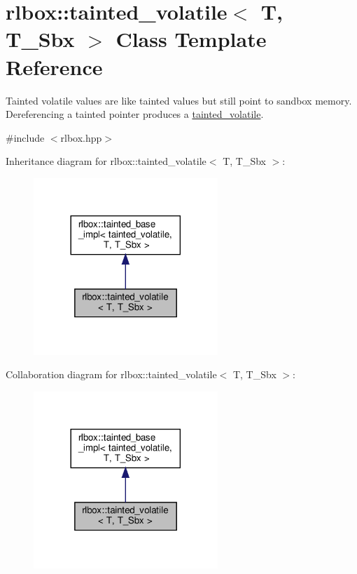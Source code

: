 \hypertarget{classrlbox_1_1tainted__volatile}{}\section{rlbox\+:\+:tainted\+\_\+volatile$<$ T, T\+\_\+\+Sbx $>$ Class Template Reference}
\label{classrlbox_1_1tainted__volatile}


Tainted volatile values are like tainted values but still point to sandbox memory. Dereferencing a tainted pointer produces a \hyperlink{classrlbox_1_1tainted__volatile}{tainted\+\_\+volatile}.  




{\ttfamily \#include $<$rlbox.\+hpp$>$}



Inheritance diagram for rlbox\+:\+:tainted\+\_\+volatile$<$ T, T\+\_\+\+Sbx $>$\+:
\nopagebreak
\begin{figure}[H]
\begin{center}
\leavevmode
\includegraphics[width=197pt]{classrlbox_1_1tainted__volatile__inherit__graph}
\end{center}
\end{figure}


Collaboration diagram for rlbox\+:\+:tainted\+\_\+volatile$<$ T, T\+\_\+\+Sbx $>$\+:
\nopagebreak
\begin{figure}[H]
\begin{center}
\leavevmode
\includegraphics[width=197pt]{classrlbox_1_1tainted__volatile__coll__graph}
\end{center}
\end{figure}
